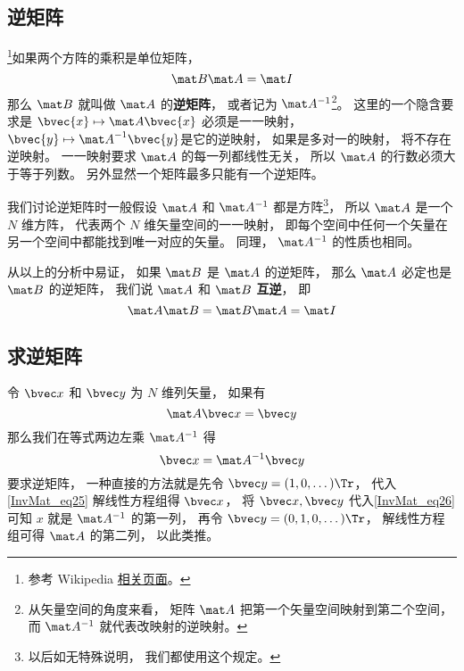
\begin{issues}
\issueTODO
\end{issues}


\subsection{逆矩阵}

\footnote{参考 Wikipedia \href{https://en.wikipedia.org/wiki/Invertible_matrix}{相关页面}。}如果两个方阵的乘积是单位矩阵， 
\begin{equation}
\mat B \mat A = \mat I
\end{equation}
那么 $\mat B$ 就叫做 $\mat A$ 的\textbf{逆矩阵}， 或者记为 $\mat A^{-1}$\footnote{从矢量空间的角度来看， 矩阵 $\mat A$ 把第一个矢量空间映射到第二个空间， 而 $\mat A^{-1}$ 就代表改映射的逆映射。}。 这里的一个隐含要求是 $\bvec{x} \mapsto \mat A \bvec{x}$ 必须是一一映射，$\bvec{y} \mapsto {\mat A}^{-1} \bvec{y}$是它的逆映射， 如果是多对一的映射， 将不存在逆映射。 一一映射要求 $\mat A$ 的每一列都线性无关，%
所以 $\mat A$ 的行数必须大于等于列数。 另外显然一个矩阵最多只能有一个逆矩阵。

我们讨论逆矩阵时一般假设 $\mat A$ 和 $\mat A^{-1}$ 都是方阵\footnote{以后如无特殊说明， 我们都使用这个规定。}， 所以 $\mat A$ 是一个 $N$ 维方阵， 代表两个 $N$ 维矢量空间的一一映射， 即每个空间中任何一个矢量在另一个空间中都能找到唯一对应的矢量。 同理， $\mat A^{-1}$ 的性质也相同。

从以上的分析中易证， 如果 $\mat B$ 是 $\mat A$ 的逆矩阵， 那么 $\mat A$ 必定也是 $\mat B$ 的逆矩阵， 我们说 $\mat A$ 和 $\mat B$ \textbf{互逆}， 即
\begin{equation}\label{InvMat_eq2}
\mat A \mat B = \mat B \mat A = \mat I
\end{equation}

\subsection{求逆矩阵}
令 $\bvec x$ 和 $\bvec y$ 为 $N$ 维列矢量， 如果有
\begin{equation}\label{InvMat_eq25}
\mat A \bvec x = \bvec y
\end{equation}
那么我们在等式两边左乘 $\mat A^{-1}$ 得
\begin{equation}\label{InvMat_eq26}
\bvec x = \mat A^{-1} \bvec y
\end{equation}
要求逆矩阵， 一种直接的方法就是先令 $\bvec y = (1, 0, \dots)\Tr$， 代入\autoref{InvMat_eq25} 解线性方程组得 $\bvec x$， 将 $\bvec x, \bvec y$ 代入\autoref{InvMat_eq26} 可知 $x$ 就是 $\mat A^{-1}$ 的第一列， 再令 $\bvec y = (0, 1, 0, \dots)\Tr$， 解线性方程组可得 $\mat A$ 的第二列， 以此类推。

